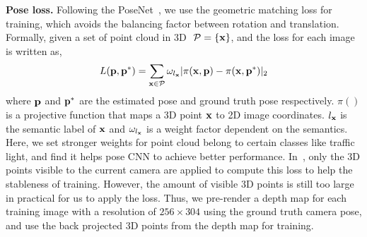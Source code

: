\textbf{Pose loss.}
Following the PoseNet~\cite{kendall2017geometric}, we use the geometric matching loss for training, which avoids the balancing factor between rotation and translation.
Formally, given a set of point cloud in 3D $~{\mathcal P}=\{{\mathbf x}\}$, and the loss for each image is written as,
{\vspace{-0.5\baselineskip}
\begin{align}
L({\mathbf p}, {\mathbf p}^*) = \sum_{{\mathbf x} \in {\mathcal P}}\omega_{l_{\mathbf x}}|\pi({\mathbf x}, {\mathbf p}) - \pi({\mathbf x}, {\mathbf p}^*)|_2
\label{eq:proj_loss}
\end{align}
}
where ${\mathbf p}$ and ${\mathbf p}^*$ are the estimated pose and ground truth pose respectively. $\pi()$ is a projective function that maps a 3D point ${\mathbf x}$ to 2D image coordinates. $l_{\mathbf x}$ is the semantic label of ${\mathbf x}$ and $\omega_{l_{\mathbf x}}$ is a weight factor dependent on the semantics. Here, we set stronger weights for point cloud belong to certain classes like traffic light, and find it helps pose CNN to achieve better performance.
In~\cite{kendall2017geometric}, only the 3D points visible to the current camera are applied to compute this loss to help the stableness of training. However, the amount of visible 3D points is still too large in practical for us to apply the loss.
Thus, we pre-render a depth map for each training image with a resolution of $256 \times 304$ using the ground truth camera pose, and use the back projected 3D points from the depth map for training.

\vspace{-0.3\baselineskip}

